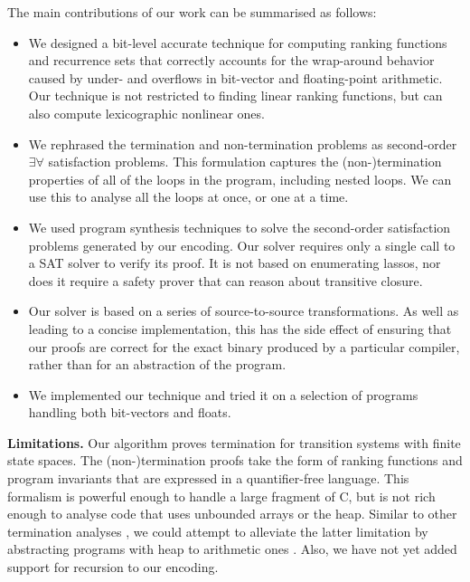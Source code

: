 \documentclass[preprint]{sigplanconf}
\theoremstyle{definition}
\begin{document}
The main contributions of our work can be summarised as follows:
%
\begin{itemize}

\item We designed a bit-level accurate technique for computing ranking
functions and recurrence sets that correctly accounts for the wrap-around
behavior caused by under- and overflows in bit-vector and floating-point arithmetic.  Our
technique is not restricted to finding linear ranking functions, but can
also compute lexicographic nonlinear ones.

\item  We rephrased the termination and non-termination problems as
second-order $\exists \forall$ satisfaction problems.  This formulation
captures the (non-)termination
properties of all of the loops in the program, including
nested loops.  We can use this to analyse all the loops at once,
or one at a time.

\item We used program synthesis techniques to solve the second-order satisfaction
problems generated by our encoding.  Our solver requires only a single call to a SAT solver to verify its
proof.  It is not based on enumerating lassos, nor does it require a safety prover
that can reason about transitive closure.

\item Our solver is based on a series of source-to-source
transformations.  As well as leading to a concise implementation, this has
the side effect of ensuring that our proofs are correct for the exact binary
produced by a particular compiler, rather than for an abstraction of the
program.

\item We implemented our technique and tried it on a selection of programs
handling both bit-vectors and floats.

\end{itemize} 

{\bf Limitations.} Our algorithm proves termination for transition systems
with finite state spaces.  The (non-)termination proofs take the form of
ranking functions and program invariants that are expressed in a
quantifier-free language.  This formalism is powerful enough to handle a
large fragment of C, but is not rich enough to analyse code that uses 
unbounded arrays or the heap. Similar to other termination analyses \cite{DBLP:conf/tacas/CookSZ13}, we could attempt to alleviate the latter limitation by abstracting programs with heap to arithmetic ones \cite{DBLP:conf/popl/MagillTLT10}. Also, we have not yet added support for recursion
to our encoding.
\end{document}
